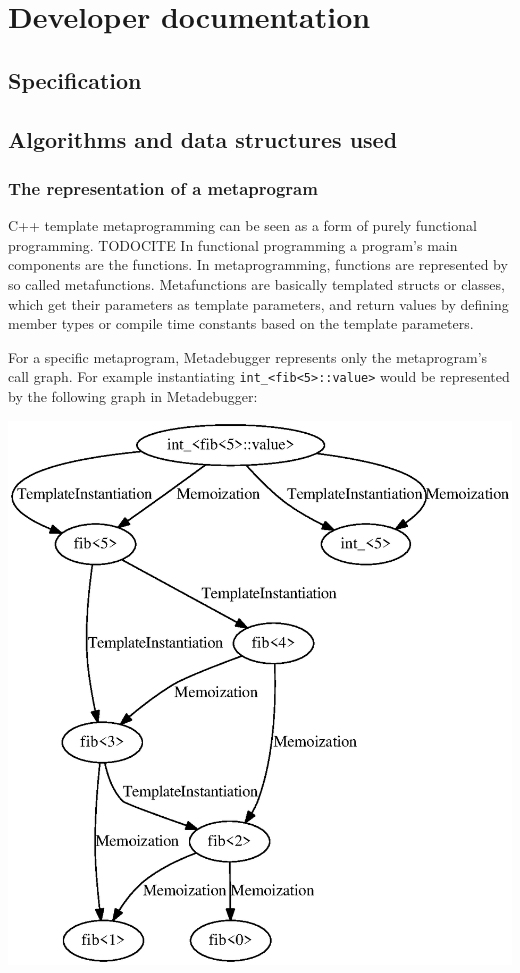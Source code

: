 
\chapter{Developer documentation}

\section{Specification}

\section{Algorithms and data structures used}

\subsection*{The representation of a metaprogram}

C++ template metaprogramming can be seen as a form of purely functional
programming. TODOCITE In functional programming a program's main components
are the functions. In metaprogramming, functions are represented by so called
metafunctions. Metafunctions are basically templated structs or classes, which
get their parameters as template parameters, and return values by defining
member types or compile time constants based on the template parameters.

For a specific metaprogram, Metadebugger represents only the metaprogram's call
graph. For example instantiating \lstinline|int_<fib<5>::value>| would be
represented by the following graph in Metadebugger:

\includegraphics[width=\textwidth]{img/fib5_call_graph.eps}

